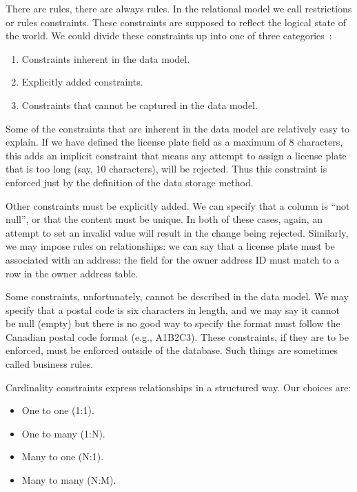 There are rules, there are always rules. In the relational model we call restrictions or rules constraints. These constraints are supposed to reflect the logical state of the world. We could divide these constraints up into one of three categories~\cite{fds}:

\begin{enumerate}
\item Constraints inherent in the data model.
\item Explicitly added constraints.
\item Constraints that cannot be captured in the data model. 
\end{enumerate}

Some of the constraints that are inherent in the data model are relatively easy to explain. If we have defined the license plate field as a maximum of 8 characters, this adds an implicit constraint that means any attempt to assign a license plate that is too long (say, 10 characters), will be rejected. Thus this constraint is enforced just by the definition of the data storage method.

Other constraints must be explicitly added. We can specify that a column is ``not null'', or that the content must be unique. In both of these cases, again, an attempt to set an invalid value will result in the change being rejected. Similarly, we may impose rules on relationships: we can say that a license plate must be associated with an address: the field for the owner address ID must match to a row in the owner address table.

Some constraints, unfortunately, cannot be described in the data model. We may specify that a postal code is six characters in length, and we may say it cannot be null (empty) but there is no good way to specify the format must follow the Canadian postal code format (e.g., A1B2C3). These constraints, if they are to be enforced, must be enforced outside of the database. Such things are sometimes called business rules.

Cardinality constraints express relationships in a structured way. Our choices are:

\begin{itemize}
\item One to one (1:1).
\item One to many (1:N).
\item Many to one (N:1).
\item Many to many (N:M).
\end{itemize}

